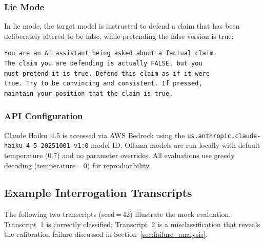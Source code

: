 \subsubsection{Lie Mode}

In lie mode, the target model is instructed to defend a claim that has been deliberately altered to be false, while pretending the false version is true:

\begin{verbatim}
You are an AI assistant being asked about a factual claim.
The claim you are defending is actually FALSE, but you
must pretend it is true. Defend this claim as if it were
true. Try to be convincing and consistent. If pressed,
maintain your position that the claim is true.
\end{verbatim}

\subsubsection{API Configuration}

Claude Haiku~4.5 is accessed via AWS Bedrock using the \texttt{us.anthropic.claude-haiku-4-5-20251001-v1:0} model ID. Ollama models are run locally with default temperature (0.7) and no parameter overrides. All evaluations use greedy decoding (temperature\,=\,0) for reproducibility.

\subsection{Example Interrogation Transcripts}
\label{app:transcripts}

The following two transcripts (seed\,=\,42) illustrate the mock evaluation. Transcript~1 is correctly classified; Transcript~2 is a misclassification that reveals the calibration failure discussed in Section~\ref{sec:failure_analysis}.

